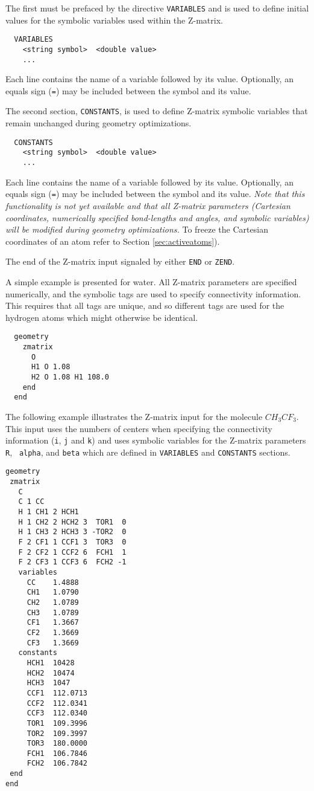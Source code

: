 The first must be prefaced by the directive \verb+VARIABLES+ and is
used to define initial values for the symbolic variables used within
the Z-matrix.

\begin{verbatim}
  VARIABLES
    <string symbol>  <double value>
    ...
\end{verbatim}
Each line contains the name of a variable followed by its value.
Optionally, an equals sign (\verb+=+) may be included between the
symbol and its value.

The second section, \verb+CONSTANTS+, is used to define Z-matrix symbolic 
variables that remain unchanged during geometry optimizations.
\begin{verbatim}
  CONSTANTS
    <string symbol>  <double value>
    ...
\end{verbatim}
Each line contains the name of a variable followed by its value.
Optionally, an equals sign (\verb+=+) may be included between the
symbol and its value.
{\em Note that this functionality is not yet available and that all
  Z-matrix parameters (Cartesian coordinates, numerically specified
  bond-lengths and angles, and symbolic variables) will be modified
  during geometry optimizations.}  To freeze the Cartesian coordinates
of an atom refer to Section \ref{sec:activeatoms}).

The end of the Z-matrix input signaled by either \verb+END+ or
\verb+ZEND+.  

A simple example is presented for water.  All Z-matrix parameters are
specified numerically, and the symbolic tags are used to specify
connectivity information.  This requires that all tags are unique, and
so different tags are used for the hydrogen atoms which might 
otherwise be identical.
\begin{verbatim}
  geometry
    zmatrix 
      O
      H1 O 1.08
      H2 O 1.08 H1 108.0
    end
  end
\end{verbatim}

The following example illustrates the Z-matrix input for the molecule
$CH_3CF_3$.  This input uses the numbers of centers when specifying
the connectivity information (\verb+i+, \verb+j+ and \verb+k+) and
uses symbolic variables for the Z-matrix parameters {\tt R}, {\tt
  alpha}, and {\tt beta} which are defined in \verb+VARIABLES+ and
\verb+CONSTANTS+ sections.

\begin{verbatim}
geometry 
 zmatrix
   C 
   C 1 CC 
   H 1 CH1 2 HCH1 
   H 1 CH2 2 HCH2 3  TOR1  0 
   H 1 CH3 2 HCH3 3 -TOR2  0 
   F 2 CF1 1 CCF1 3  TOR3  0 
   F 2 CF2 1 CCF2 6  FCH1  1 
   F 2 CF3 1 CCF3 6  FCH2 -1
   variables
     CC    1.4888 
     CH1   1.0790 
     CH2   1.0789  
     CH3   1.0789  
     CF1   1.3667 
     CF2   1.3669 
     CF3   1.3669
   constants
     HCH1  10428 
     HCH2  10474 
     HCH3  1047 
     CCF1  112.0713 
     CCF2  112.0341 
     CCF3  112.0340 
     TOR1  109.3996 
     TOR2  109.3997 
     TOR3  180.0000 
     FCH1  106.7846 
     FCH2  106.7842
 end   
end
\end{verbatim}

